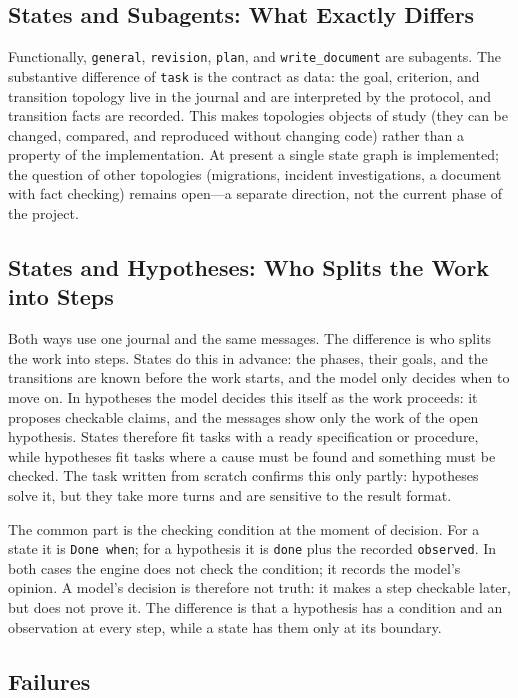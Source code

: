 \documentclass[11pt,a4paper]{article}
\begin{document}
\subsection{States and Subagents: What Exactly Differs}

Functionally, \texttt{general}, \texttt{revision}, \texttt{plan}, and \texttt{write\_document}
are subagents. The substantive difference of \texttt{task} is the contract as data: the goal,
criterion, and transition topology live in the journal and are interpreted by the protocol, and
transition facts are recorded. This makes topologies objects of study (they can be changed,
compared, and reproduced without changing code) rather than a property of the implementation.
At present a single state graph is implemented; the question of other topologies (migrations,
incident investigations, a document with fact checking) remains open---a separate direction,
not the current phase of the project.

\subsection{States and Hypotheses: Who Splits the Work into Steps}

Both ways use one journal and the same messages. The difference is who splits the work into steps.
States do this in advance: the phases, their goals, and the transitions are known before the work
starts, and the model only decides when to move on. In hypotheses the model decides this itself as
the work proceeds: it proposes checkable claims, and the messages show only the work of the open
hypothesis. States therefore fit tasks with a ready specification or procedure, while hypotheses
fit tasks where a cause must be found and something must be checked. The task written from scratch
confirms this only partly: hypotheses solve it, but they take more turns and are sensitive to the
result format.

The common part is the checking condition at the moment of decision. For a state it is
\texttt{Done when}; for a hypothesis it is \texttt{done} plus the recorded \texttt{observed}. In
both cases the engine does not check the condition; it records the model's opinion. A model's
decision is therefore not truth: it makes a step checkable later, but does not prove it. The
difference is that a hypothesis has a condition and an observation at every step, while a state
has them only at its boundary.

\subsection{Failures}
\end{document}
